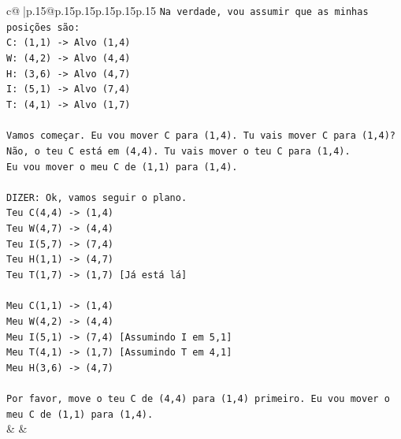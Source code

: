 \documentclass{article}
\begin{document}
{\begin{supertabular}{c@{$\;$}|p{.15\linewidth}@{}p{.15\linewidth}p{.15\linewidth}p{.15\linewidth}p{.15\linewidth}p{.15\linewidth}}
{{{\texttt{Na verdade, vou assumir que as minhas posições são:} \\
\texttt{C: (1,1) {-}> Alvo (1,4)} \\
\texttt{W: (4,2) {-}> Alvo (4,4)} \\
\texttt{H: (3,6) {-}> Alvo (4,7)} \\
\texttt{I: (5,1) {-}> Alvo (7,4)} \\
\texttt{T: (4,1) {-}> Alvo (1,7)} \\
\\ 
\texttt{Vamos começar. Eu vou mover C para (1,4). Tu vais mover C para (1,4)? Não, o teu C está em (4,4). Tu vais mover o teu C para (1,4).} \\
\texttt{Eu vou mover o meu C de (1,1) para (1,4).} \\
\\ 
\texttt{DIZER: Ok, vamos seguir o plano.} \\
\texttt{Teu C(4,4) {-}> (1,4)} \\
\texttt{Teu W(4,7) {-}> (4,4)} \\
\texttt{Teu I(5,7) {-}> (7,4)} \\
\texttt{Teu H(1,1) {-}> (4,7)} \\
\texttt{Teu T(1,7) {-}> (1,7) {[}Já está lá{]}} \\
\\ 
\texttt{Meu C(1,1) {-}> (1,4)} \\
\texttt{Meu W(4,2) {-}> (4,4)} \\
\texttt{Meu I(5,1) {-}> (7,4) {[}Assumindo I em 5,1{]}} \\
\texttt{Meu T(4,1) {-}> (1,7) {[}Assumindo T em 4,1{]}} \\
\texttt{Meu H(3,6) {-}> (4,7)} \\
\\ 
\texttt{Por favor, move o teu C de (4,4) para (1,4) primeiro. Eu vou mover o meu C de (1,1) para (1,4).} \\
            }
        }
    }
    & & \\ \\


\end{supertabular}}
\end{document}

